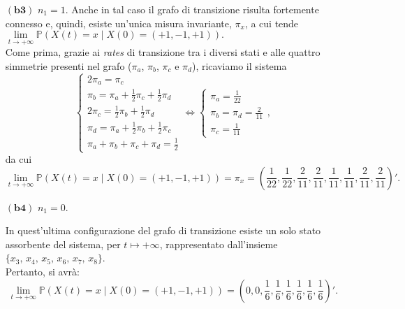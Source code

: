 \documentclass[11pt,largemargins]{homework}
\begin{document}
\begin{alphaparts}
\begin{itemize}
  
  \newpage
   \item[$\left(\textbf{b3}\right)$] $n_{1}=1$. 
  Anche in tal caso il grafo di transizione risulta fortemente connesso e, quindi, esiste un'unica misura invariante, $\pi_{x}$, a cui tende $\lim\limits_{t \rightarrow +\infty}\mathbb{P}\left(X\left(t\right)=x\mid X\left(0\right)=\left(+1,-1,+1\right)\right).$\\
  Come prima, grazie  ai \emph{rates} di transizione tra i diversi stati e alle quattro simmetrie presenti nel grafo ($\pi_{a}$, $\pi_{b}$, $\pi_{c}$ e $\pi_{d}$), ricaviamo il sistema
  \begin{equation*}
  \begin{cases}2\pi_{a}=\pi_{c}\\
  \pi_{b}=\pi_{a}+\frac{1}{2}\pi_{c}+\frac{1}{2}\pi_{d}\\
  2\pi_{c}=\frac{1}{2}\pi_{b}+\frac{1}{2}\pi_{d}\\
  \pi_{d}=\pi_{a}+\frac{1}{2}\pi_{b}+\frac{1}{2}\pi_{c}\\
  \pi_{a}+\pi_{b}+\pi_{c}+\pi_{d}=\frac{1}{2}\end{cases}
  \Leftrightarrow
  \begin{cases}\pi_{a}=\frac{1}{22}\\
  \pi_{b}=\pi_{d}=\frac{2}{11}\\
  \pi_{c}=\frac{1}{11}\end{cases},
  \end{equation*}
  da cui
  \begin{equation*}
  \lim\limits_{t \rightarrow +\infty}\mathbb{P}\left(X\left(t\right)=x\mid X\left(0\right)=\left(+1,-1,+1\right)\right)=\pi_{x}=\left(\frac{1}{22},\frac{1}{22},\frac{2}{11},\frac{2}{11},\frac{1}{11},\frac{1}{11},\frac{2}{11},\frac{2}{11}\right)'.
  \end{equation*}
  
  \newpage
  \item[$\left(\textbf{b4}\right)$] $n_{1}=0$. 
  
  
  In quest'ultima configurazione del grafo di transizione esiste un solo stato assorbente del sistema, per $t\mapsto +\infty$, rappresentato dall'insieme $\{x_{3}, \, x_{4}, \, x_{5}, \, x_{6}, \, x_{7}, \, x_{8}\}$.\\
  Pertanto, si avrà:
  \begin{equation*}
  \lim\limits_{t \rightarrow +\infty}\mathbb{P}\left(X\left(t\right)=x\mid X\left(0\right)=\left(+1,-1,+1\right)\right)=\left(0,0,\frac{1}{6},\frac{1}{6},\frac{1}{6},\frac{1}{6},\frac{1}{6},\frac{1}{6}\right)'.
\end{equation*}
   
   \end{itemize}
   \end{alphaparts}
\end{document}
